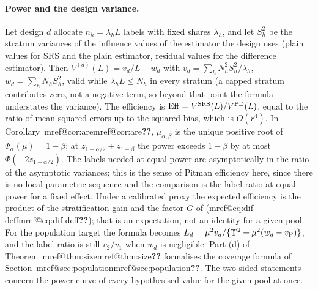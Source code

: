 \documentclass[pdflatex,sn-mathphys-num,iicol]{sn-jnl}
\makeatletter
\theoremstyle{thmstyleone}
\theoremstyle{thmstyletwo}
\theoremstyle{thmstylethree}
\newcommand{\Mref}[1]{\ifcsname mref@#1\endcsname\csname mref@#1\endcsname\else\textbf{??}\fi}
\makeatother
\begin{document}
\paragraph{Power and the design variance.} Let design $d$ allocate $n_h=\lambda_hL$ labels with fixed shares $\lambda_h$, and let $S^2_h$ be the stratum variances of the influence values of the estimator the design uses (plain values for SRS and the plain estimator, residual values for the difference estimator). Then $V^{(d)}(L)=v_d/L-w_d$ with $v_d=\sum_hN_h^2S^2_h/\lambda_h$, $w_d=\sum_hN_hS^2_h$, valid while $\lambda_hL\le N_h$ in every stratum (a capped stratum contributes zero, not a negative term, so beyond that point the formula understates the variance). The efficiency is $\mathrm{Eff}=V^{\rm SRS}(L)/V^{\rm PD}(L)$, equal to the ratio of mean squared errors up to the squared bias, which is $O(r^4)$. In Corollary~\Mref{cor:are}, $\mu_{\alpha,\beta}$ is the unique positive root of $\Psi_\alpha(\mu)=1-\beta$; at $z_{1-\alpha/2}+z_{1-\beta}$ the power exceeds $1-\beta$ by at most $\Phi(-2z_{1-\alpha/2})$. The labels needed at equal power are asymptotically in the ratio of the asymptotic variances; this is the sense of Pitman efficiency here, since there is no local parametric sequence and the comparison is the label ratio at equal power for a fixed effect. Under a calibrated proxy the expected efficiency is the product of the stratification gain and the factor $G$ of (\Mref{eq:dif-deff}); that is an expectation, not an identity for a given pool. For the population target the formula becomes $L_d=\mu^2v_d/\{\Upsilon^2+\mu^2(w_d-v_{\rm P})\}$, and the label ratio is still $v_2/v_1$ when $w_d$ is negligible. Part (d) of Theorem~\Mref{thm:size} formalises the coverage formula of Section~\Mref{sec:population}. The two-sided statements concern the power curve of every hypothesised value for the given pool at once.
\end{document}
